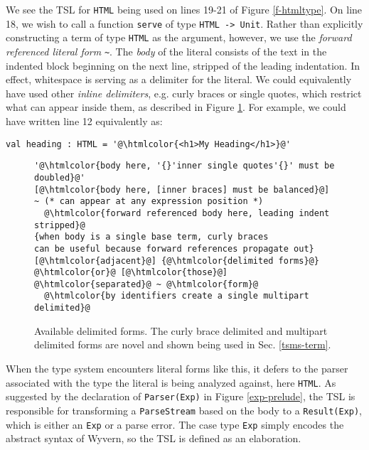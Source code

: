 \documentclass{sig-alternate}
\newcommand{\htmlcolor}[1]{\textcolor[HTML]{339933}{#1}}
\newcommand{\mycaption}[1]{\vspace{-4px}\caption{#1}\vspace{-2px}}
\begin{document}
We see the TSL for \verb|HTML| being used on lines 19-21 of Figure \ref{f-htmltype}. On line 18, we wish to call a function \verb|serve| of type \verb|HTML -> Unit|. Rather than explicitly constructing a term of type \verb|HTML| as the argument, however, we use the \emph{forward referenced literal form} \lstinline[style=wyvern]{~}. The \emph{body} of the literal consists of the text in the indented block beginning on the next line, stripped of the leading indentation. In effect, whitespace is serving as a delimiter for the literal. We could equivalently have used other \emph{inline delimiters}, e.g. curly braces or single quotes, which restrict what can appear inside them, as described in Figure \ref{f-delimited}. For example, we could have written line 12 equivalently as:
\begin{lstlisting}[style=wyvern, numbers=none, frame=none]
  val heading : HTML = '@\htmlcolor{<h1>My Heading</h1>}@'
\end{lstlisting}

\begin{figure}[t]
\begin{lstlisting}[style=tempwyvern]
'@\htmlcolor{body here, '{}'inner single quotes'{}' must be doubled}@'
[@\htmlcolor{body here, [inner braces] must be balanced}@]
~ (* can appear at any expression position *)
  @\htmlcolor{forward referenced body here, leading indent stripped}@
{when body is a single base term, curly braces
can be useful because forward references propagate out}
[@\htmlcolor{adjacent}@] {@\htmlcolor{delimited forms}@} @\htmlcolor{or}@ [@\htmlcolor{those}@] @\htmlcolor{separated}@ ~ @\htmlcolor{form}@
  @\htmlcolor{by identifiers create a single multipart delimited}@
\end{lstlisting}
\mycaption{Available delimited forms. The curly brace delimited and multipart delimited forms are novel and shown being used in Sec. \ref{tsms-term}. }
\label{f-delimited}
\end{figure}


When the type system encounters literal forms like this, it defers to the parser associated with the type the literal is being analyzed against, here \verb|HTML|. As suggested by the declaration of \verb|Parser(Exp)| in Figure \ref{exp-prelude}, the TSL is responsible for transforming a \verb|ParseStream| based on the body to a \verb|Result(Exp)|, which is either an \verb|Exp| or a parse error. The case type \verb|Exp| simply encodes the abstract syntax of Wyvern, so the TSL is defined as an elaboration.
\end{document}
